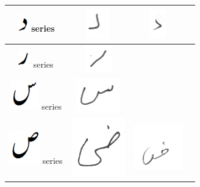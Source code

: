 \documentclass[a4paper,conference]{IEEEtran}
\begin{document}
\begin{table}[h]
\begin{tabular}{@{}cccc@{}}
\hline
\includegraphics[scale=0.25]{daal_orig} series & \includegraphics[scale=0.15]{125} & \includegraphics[scale=0.15]{126}  &  \\
\hline
\includegraphics[scale=0.25]{re_orig} series & \includegraphics[scale=0.15]{127} &  &  \\
\hline
\includegraphics[scale=0.25]{seen_orig} series & \includegraphics[scale=0.15]{128} &  &  \\
\hline
\includegraphics[scale=0.20]{suad_orig} series & \includegraphics[scale=0.15]{129} & \includegraphics[scale=0.15]{130}  &  \\

\end{tabular}
\end{table}
\end{document}
